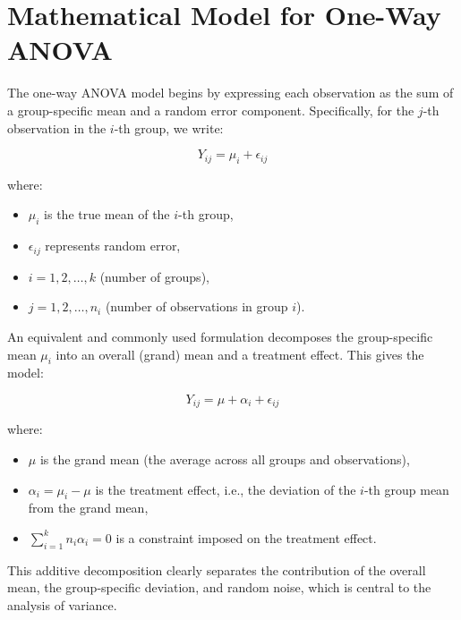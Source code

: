 \documentclass[twoside]{book}
\begin{document}
\section{Mathematical Model for One-Way ANOVA}

The one-way ANOVA model begins by expressing each observation as the sum of a group-specific mean and a random error component. Specifically, for the \( j \)-th observation in the \( i \)-th group, we write:

\begin{textbox}
\begin{equation*}
Y_{ij} = \mu_i + \epsilon_{ij}
\end{equation*}
\end{textbox}

where:
\begin{itemize}
    \item \( \mu_i \) is the true mean of the \( i \)-th group,
    \item \( \epsilon_{ij}\) represents random error,
    \item \( i = 1, 2, \ldots, k \) (number of groups),
    \item \( j = 1, 2, \ldots, n_i \) (number of observations in group \( i \)).
\end{itemize}

An equivalent and commonly used formulation decomposes the group-specific mean \( \mu_i \) into an overall (grand) mean and a treatment effect. This gives the model:

\begin{textbox}
\begin{equation*}
Y_{ij} = \mu + \alpha_i + \epsilon_{ij}
\end{equation*}
\end{textbox}

where:
\begin{itemize}
    \item \( \mu \) is the grand mean (the average across all groups and observations),
    \item \( \alpha_i = \mu_i - \mu \) is the treatment effect, i.e., the deviation of the \( i \)-th group mean from the grand mean,
    \item \( \sum_{i=1}^k n_i \alpha_i = 0 \) is a constraint imposed on the treatment effect.
\end{itemize}

This additive decomposition clearly separates the contribution of the overall mean, the group-specific deviation, and random noise, which is central to the analysis of variance.
\end{document}
